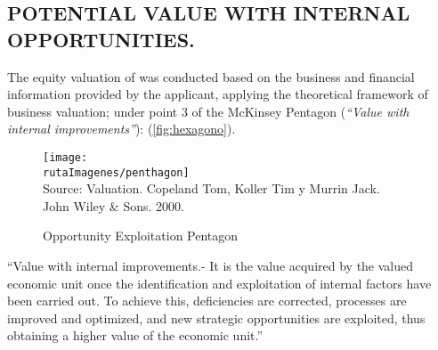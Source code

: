 \subsection{POTENTIAL VALUE WITH INTERNAL OPPORTUNITIES.} 


The equity valuation of \textcolor{principal}{\empresaSolicitante} was conducted based on the business and financial information provided by the applicant, applying the theoretical framework of business valuation; under point 3 of the McKinsey Pentagon (\textit{``Value with internal improvements''}): (\textcolor{terciario}{\autoref{fig:hexagono}}).

\begin{figure}[H]
\centering
\caption{Opportunity Exploitation Pentagon \label{fig:hexagono}}\vspace{10pt}
\texttt{[image: \\rutaImagenes/penthagon]}\\
Source: Valuation. Copeland Tom, Koller Tim y Murrin Jack.\\

John Wiley \& Sons. 2000.
\end{figure}

``\textcolor{secundario}{Value with internal improvements}.- It is the value acquired by the valued economic unit once the identification and exploitation of internal factors have been carried out. To achieve this, deficiencies are corrected, processes are improved and optimized, and new strategic opportunities are exploited, thus obtaining a higher value of the economic unit.''\\

